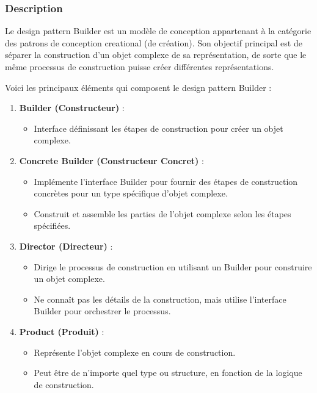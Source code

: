 \subsubsection{Description}

Le design pattern Builder est un modèle de conception appartenant à la catégorie des patrons de conception creational (de création). Son objectif principal est de séparer la construction d'un objet complexe de sa représentation, de sorte que le même processus de construction puisse créer différentes représentations.

Voici les principaux éléments qui composent le design pattern Builder :

\begin{enumerate}[leftmargin=*,labelsep=3mm]
    \item \textbf{Builder (Constructeur)} :
    \begin{itemize}
        \item Interface définissant les étapes de construction pour créer un objet complexe.
    \end{itemize}
    
    \item \textbf{Concrete Builder (Constructeur Concret)} :
    \begin{itemize}
        \item Implémente l'interface Builder pour fournir des étapes de construction concrètes pour un type spécifique d'objet complexe.
        \item Construit et assemble les parties de l'objet complexe selon les étapes spécifiées.
    \end{itemize}
    
    \item \textbf{Director (Directeur)} :
    \begin{itemize}
        \item Dirige le processus de construction en utilisant un Builder pour construire un objet complexe.
        \item Ne connaît pas les détails de la construction, mais utilise l'interface Builder pour orchestrer le processus.
    \end{itemize}
    
    \item \textbf{Product (Produit)} :
    \begin{itemize}
        \item Représente l'objet complexe en cours de construction.
        \item Peut être de n'importe quel type ou structure, en fonction de la logique de construction.
    \end{itemize}
\end{enumerate}

